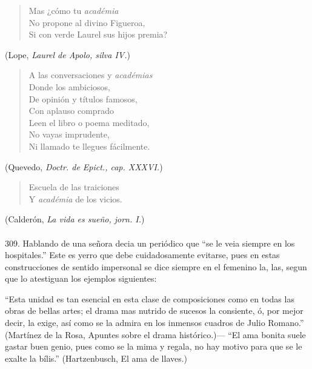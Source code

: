 \documentclass{book}
\begin{document}
\begin{verse}
Mas ¿cómo tu \emph{académia} \\
No propone al divino Figueroa, \\
Si con verde Laurel sus hijos premia?
\end{verse}
\begin{flushright}
(Lope, \emph{Laurel de Apolo, silva IV.})
\end{flushright}

\begin{verse}
A las conversaciones y \emph{académias} \\
Donde los ambiciosos, \\
De opinión y títulos famosos, \\
Con aplauso comprado \\
Leen el libro o poema meditado, \\
No vayas imprudente, \\
Ni llamado te llegues fácilmente.
\end{verse}
\begin{flushright}
(Quevedo, \emph{Doctr. de Epict., cap. XXXVI.})
\end{flushright}

\begin{verse}
Escuela de las traiciones \\
Y \emph{académia} de los vicios.
\end{verse}
\begin{flushright}
(Calderón, \emph{La vida es sueño, jorn. I.})
\end{flushright}

\normalsize

\paragraph{} 309. Hablando de una señora decia un periódico que “se le veia siempre en los hospitales.” Este es 
yerro que debe cuidadosamente evitarse, pues en estas construcciones de sentido impersonal se dice siempre en el 
femenino la, las, segun que lo atestiguan los ejemplos siguientes:

``Esta unidad es tan esencial en esta clase de composiciones como en todas las obras de bellas artes; el drama 
mas nutrido de sucesos la consiente, ó, por mejor decir, la exige, así como se la admira en los inmensos cuadros 
de Julio Romano.'' (Martínez de la Rosa, Apuntes sobre el drama histórico.)--- ``El  ama bonita suele gastar 
buen genio, pues como se la mima y regala, no hay motivo para que se le exalte la bílis.'' (Hartzenbusch, El ama 
de llaves.)
\end{document}
